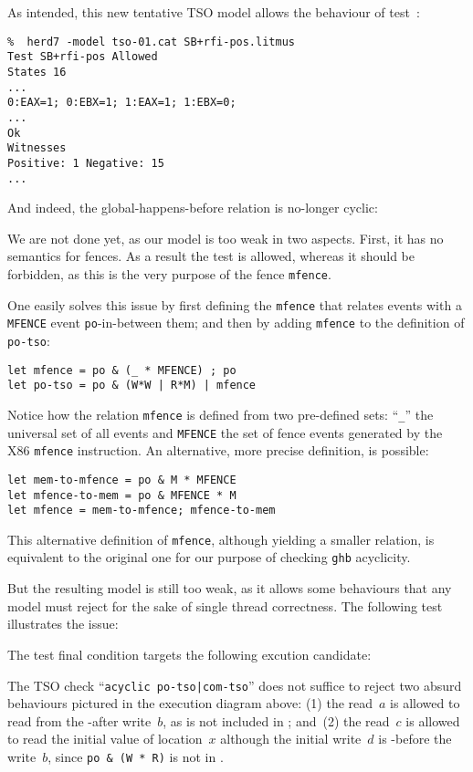 As intended, this new tentative TSO model allows the behaviour of test~:
\begin{verbatim}
%  herd7 -model tso-01.cat SB+rfi-pos.litmus
Test SB+rfi-pos Allowed
States 16
...
0:EAX=1; 0:EBX=1; 1:EAX=1; 1:EBX=0;
...
Ok
Witnesses
Positive: 1 Negative: 15
...
\end{verbatim}
And indeed, the global-happens-before relation is no-longer cyclic:
\begin{center}\end{center}


We are not done yet, as our model is too weak in two aspects.
First, it has no semantics for fences.
As a result the test  is allowed, whereas it should
be forbidden, as this is the very purpose of the fence \texttt{mfence}.
\begin{center}\end{center}
One easily solves this issue by first defining the \verb+mfence+
that relates events with a \verb+MFENCE+ event \texttt{po}-in-between them;
and then by adding \verb+mfence+ to the definition of \verb+po-tso+:
\begin{verbatim}
let mfence = po & (_ * MFENCE) ; po
let po-tso = po & (W*W | R*M) | mfence
\end{verbatim}
Notice how the relation \verb+mfence+ is defined from two pre-defined sets:
``\verb+_+'' the universal set of all events and \verb+MFENCE+ the set
of fence events generated by the X86 \texttt{mfence} instruction.
An alternative, more precise definition, is possible:
\begin{verbatim}
let mem-to-mfence = po & M * MFENCE
let mfence-to-mem = po & MFENCE * M
let mfence = mem-to-mfence; mfence-to-mem
\end{verbatim}
This alternative definition of \texttt{mfence},
although yielding a smaller relation, is equivalent to the original one
for our purpose of checking \texttt{ghb} acyclicity.

But the resulting model is still too weak,
as it allows some behaviours that any model must
reject for the sake of single thread correctness.
The following test  illustrates the issue:

The test final condition targets the following excution candidate:
\begin{center}\end{center}
The TSO check ``\verb+acyclic po-tso|com-tso+'' does not suffice to reject
two absurd behaviours pictured in the execution diagram above:
(1) the read~$a$ is allowed to
read from the -after write~$b$, as  is not included
in ; and~(2)
the read~$c$ is allowed to read the initial value of location~$x$
although the initial write~$d$ is -before the write~$b$,
since \verb+po & (W * R)+ is not in .

